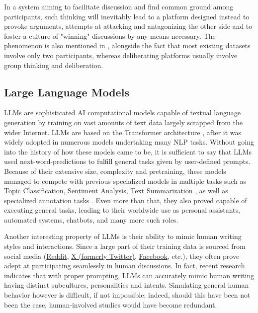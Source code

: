 In a system aiming to facilitate discussion and find common ground among participants, such thinking will inevitably lead to a platform designed instead to provoke arguments, attempts at attacking and antagonizing the other side and to foster a culture of "winning" discussions by any means necessary. The phenomenon is also mentioned in \citet{karadzhov2023delidata}, alongside the fact that most existing datasets involve only two participants, whereas deliberating platforms usually involve group thinking and deliberation. 

\subsection{Large Language Models}
\label{sec:background:llm}

\acp{LLM} are sophisticated \ac{AI} computational models capable of textual language generation by training on vast amounts of text data largely scrapped from the wider Internet. LLMs are based on the Transformer architecture \cite{vaswani2023attentionneed}, after it was widely adopted in numerous models undertaking many \ac{NLP} tasks. Without going into the history of how these models came to be, it is sufficient to say that LLMs used next-word-predictions to fulfill general tasks given by user-defined prompts. Because of their extensive size, complexity and pretraining, these models managed to compete with  previous specialized models in multiple tasks such as Topic Classification, Sentiment Analysis, Text Summarization \cite{ts2024}, as well as specialized annotation tasks \cite{tan2024largelanguagemodelsdata}.  Even more than that, they also proved capable of executing general tasks, leading to their worldwide use as personal assistants, automated systems, chatbots, and many more such roles. 

Another interesting property of LLMs is their ability to mimic human writing styles and interactions. Since a large part of their training data is sourced from social media (\href{https://www.reddit.com}{Reddit}, \href{https://www.twitter.com}{X (formerly Twitter)}, \href{https://www.facebook.com}{Facebook}, etc.), they often prove adept at participating seamlessly in human discussions. In fact, recent research \cite{Vezhnevets2023GenerativeAM, aher2023usinglargelanguagemodels} indicates that with proper prompting, LLMs can accurately mimic human writing having distinct subcultures, personalities and intents. Simulating general human behavior however is difficult, if not impossible; indeed, should this have been not been the case, human-involved studies would have become redundant.

